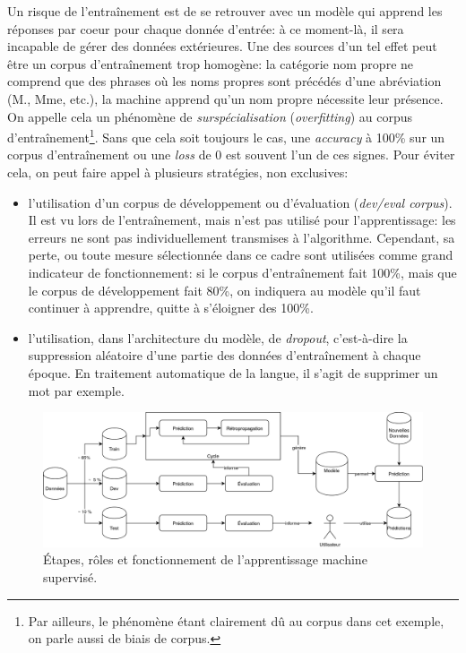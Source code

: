 \label{deep-learning:overfitting}
Un risque de l'entraînement est de se retrouver avec un modèle qui apprend les réponses par coeur pour chaque donnée d'entrée: à ce moment-là, il sera incapable de gérer des données extérieures. Une des sources d'un tel effet peut être un corpus d'entraînement trop homogène: la catégorie nom propre ne comprend que des phrases où les noms propres sont précédés d'une abréviation (M., Mme, etc.), la machine apprend qu'un nom propre nécessite leur présence. On appelle cela un phénomène de \textit{surspécialisation} (\textit{overfitting}) au corpus d'entraînement\footnote{Par ailleurs, le phénomène étant clairement dû au corpus dans cet exemple, on parle aussi de biais de corpus.}. Sans que cela soit toujours le cas, une \textit{accuracy} à 100\% sur un corpus d'entraînement ou une \textit{loss} de 0 est souvent l'un de ces signes. Pour éviter cela, on peut faire appel à plusieurs stratégies, non exclusives:
\begin{itemize}
    \item l'utilisation d'un corpus de développement ou d'évaluation (\textit{dev/eval corpus}). Il est vu lors de l'entraînement, mais n'est pas utilisé pour l'apprentissage: les erreurs ne sont pas individuellement transmises à l'algorithme. Cependant, sa perte, ou toute mesure sélectionnée dans ce cadre sont utilisées comme grand indicateur de fonctionnement: si le corpus d'entraînement fait 100\%, mais que le corpus de développement fait 80\%, on indiquera au modèle qu'il faut continuer à apprendre, quitte à s'éloigner des 100\%.
    \item l'utilisation, dans l'architecture du modèle, de \textit{dropout}, c'est-à-dire la suppression aléatoire d'une partie des données d'entraînement à chaque époque. En traitement automatique de la langue, il s'agit de supprimer un mot par exemple.
\end{itemize}


\begin{figure}[h]
    \centering
    \includegraphics[width=\linewidth]{figures/chap2/MachineLearning.png}
    \caption{Étapes, rôles et fonctionnement de l'apprentissage machine supervisé.}
    \label{fig:deep-learning:fonctionnement}
\end{figure}

